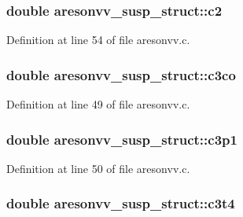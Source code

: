\subsubsection[{\texorpdfstring{c2}{c2}}]{\setlength{\rightskip}{0pt plus 5cm}double aresonvv\+\_\+susp\+\_\+struct\+::c2}\hypertarget{structaresonvv__susp__struct_a0823683ff9b1b1a62d0be27a4e1117fa}{}\label{structaresonvv__susp__struct_a0823683ff9b1b1a62d0be27a4e1117fa}


Definition at line 54 of file aresonvv.\+c.

\subsubsection[{\texorpdfstring{c3co}{c3co}}]{\setlength{\rightskip}{0pt plus 5cm}double aresonvv\+\_\+susp\+\_\+struct\+::c3co}\hypertarget{structaresonvv__susp__struct_ac4be464876e9eb7b5d3ce783bd1ec941}{}\label{structaresonvv__susp__struct_ac4be464876e9eb7b5d3ce783bd1ec941}


Definition at line 49 of file aresonvv.\+c.

\subsubsection[{\texorpdfstring{c3p1}{c3p1}}]{\setlength{\rightskip}{0pt plus 5cm}double aresonvv\+\_\+susp\+\_\+struct\+::c3p1}\hypertarget{structaresonvv__susp__struct_a7dbf85e6819fdac1fc9d1bcda59b29e9}{}\label{structaresonvv__susp__struct_a7dbf85e6819fdac1fc9d1bcda59b29e9}


Definition at line 50 of file aresonvv.\+c.

\subsubsection[{\texorpdfstring{c3t4}{c3t4}}]{\setlength{\rightskip}{0pt plus 5cm}double aresonvv\+\_\+susp\+\_\+struct\+::c3t4}\hypertarget{structaresonvv__susp__struct_a9f13f4a5fc5dce4ed679f511ec9baba9}{}\label{structaresonvv__susp__struct_a9f13f4a5fc5dce4ed679f511ec9baba9}


